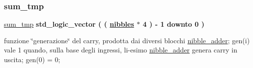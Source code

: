 \subsubsection{\texorpdfstring{sum\+\_\+tmp}{sum\_tmp}}
{\footnotesize\ttfamily \hyperlink{group___carry_loockahead_ga6cccc2d4712341bbafb7f30f9e9c0f79}{sum\+\_\+tmp} {\bfseries \textcolor{vhdlchar}{std\+\_\+logic\+\_\+vector}\textcolor{vhdlchar}{ }\textcolor{vhdlchar}{(}\textcolor{vhdlchar}{ }\textcolor{vhdlchar}{(}\textcolor{vhdlchar}{ }\textcolor{vhdlchar}{ }\textcolor{vhdlchar}{ }\textcolor{vhdlchar}{ }{\bfseries \hyperlink{group___carry_loockahead_ga0b63b586531492d0fa882246cca071c1}{nibbles}} \textcolor{vhdlchar}{$\ast$}\textcolor{vhdlchar}{ } \textcolor{vhdldigit}{4} \textcolor{vhdlchar}{ }\textcolor{vhdlchar}{)}\textcolor{vhdlchar}{ }\textcolor{vhdlchar}{-\/}\textcolor{vhdlchar}{ } \textcolor{vhdldigit}{1} \textcolor{vhdlchar}{ }\textcolor{vhdlchar}{downto}\textcolor{vhdlchar}{ }\textcolor{vhdlchar}{ } \textcolor{vhdldigit}{0} \textcolor{vhdlchar}{ }\textcolor{vhdlchar}{)}\textcolor{vhdlchar}{ }} \hspace{0.3cm}{\ttfamily [Signal]}}

funzione \char`\"{}generazione\char`\"{} del carry, prodotta dai diversi blocchi \hyperlink{classnibble__adder}{nibble\+\_\+adder}; gen(i) vale 1 quando, sulla base degli ingressi, l\textquotesingle{}i-\/esimo \hyperlink{classnibble__adder}{nibble\+\_\+adder} genera carry in uscita; gen(0) = \textquotesingle{}0\textquotesingle{}; 